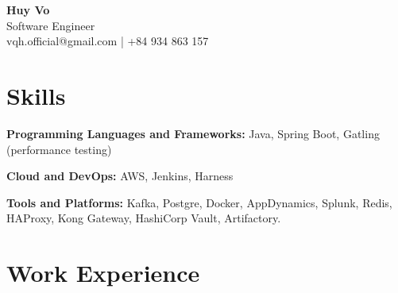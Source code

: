 \documentclass[11pt,a4paper]{article}
\begin{document}
\begin{center}
    {\Huge \textbf{Huy Vo}} \\ %
    \vspace{2mm}
    Software Engineer \\
    \vspace{1mm}
    vqh.official@gmail.com | +84 934 863 157 \\ %
\end{center}

\section*{Skills}

\textbf{Programming Languages and Frameworks:} Java, Spring Boot, Gatling (performance testing)

\textbf{Cloud and DevOps:} AWS, Jenkins, Harness

\textbf{Tools and Platforms:} Kafka, Postgre, Docker, AppDynamics, Splunk, Redis, HAProxy, Kong Gateway, HashiCorp Vault, Artifactory.

\section*{Work Experience}
\end{document}

